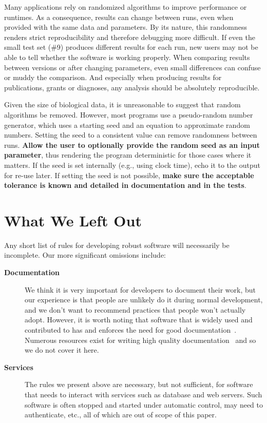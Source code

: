 \documentclass[10pt,letterpaper]{article}
\begin{document}
Many applications rely on randomized algorithms to
improve performance or runtimes. As a consequence, results can change
between runs, even when provided with the same data and parameters. By
its nature, this randomness renders strict reproducibility and therefore
debugging more difficult. If even the small test set (\#9) produces
different results for each run, new users may not be able to tell whether the software is
working properly. When comparing
results between versions or after changing parameters, even small
differences can confuse or muddy the comparison. And especially when
producing results for publications, grants or diagnoses, any analysis
should be absolutely reproducible.

Given the size of biological data, it is unreasonable to suggest that
random algorithms be removed. However, most programs use a pseudo-random
number generator, which uses a starting seed and an equation to
approximate random numbers. Setting the seed to a consistent value
can remove randomness between runs. \textbf{Allow the user to optionally provide
the random seed as an input parameter}, thus rendering the program deterministic
for those cases where it matters. If the seed is set internally (e.g.,
using clock time), echo it to the output for re-use later. 
If setting the seed is not possible, \textbf{make sure the acceptable tolerance is
known and detailed in documentation and in the tests}.

\section*{What We Left Out}

Any short list of rules for developing robust software will
necessarily be incomplete.   Our more significant omissions
include:

\begin{description}

\item[\textbf{Documentation}] We think it is very important for
  developers to document their work, but our experience is that people
  are unlikely do it during normal development, and we don't want to
  recommend practices that people won't actually adopt. However, it is worth
  noting that software that is widely used and contributed to has and enforces
  the need for good documentation~\cite{gentleman2004}.
  Numerous resources exist for writing high quality
  documentation~\cite{karimzadeh2016} and so we do not cover it here.

\item[\textbf{Services}] The rules we present above are necessary, but
  not sufficient, for software that needs to interact with services
  such as database and web servers.  Such software is often stopped
  and started under automatic control, may need to authenticate, etc.,
  all of which are out of scope of this paper.

\end{description}
\end{document}
